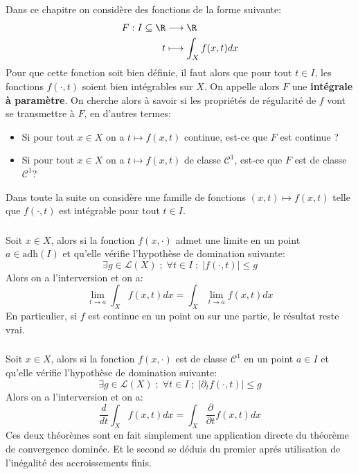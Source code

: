 \chapter*{} %
Dans ce chapitre on considère des fonctions de la forme suivante:
\[
   \begin{aligned}
      F : I \subseteq \R &\longrightarrow \R\\
      t &\longmapsto \int_X f(x, t) dx
   \end{aligned}
\]
Pour que cette fonction soit bien définie, il faut alors que pour tout \(t \in I\), les fonctions \(f(\cdot, t)\) soient bien intégrables sur \(X\). On appelle alors \(F\) une \textbf{intégrale à paramètre}. On cherche alors à savoir si les propriétés de régularité de \(f\) vont se transmettre à \(F\), en d'autres termes:
\begin{itemize}
   \item Si pour tout \(x \in X\) on a \(t \mapsto f(x, t)\) continue, est-ce que \(F\) est continue ?
   \item Si pour tout \(x \in X\) on a \(t \mapsto f(x, t)\) de classe \(\mathcal{C}^1\), est-ce que \(F\) est de classe \(\mathcal{C}^1\)?
\end{itemize}
Dans toute la suite on considère une famille de fonctions \((x, t) \mapsto f(x, t)\) telle que \(f(\cdot, t)\) est intégrable pour tout \(t \in I\).

\subsection*{}
Soit \(x \in X\), alors si la fonction \(f(x, \cdot)\) admet une limite en un point \(a \in \text{adh}(I)\) et qu'elle vérifie l'hypothèse de domination suivante:
\[
   \exists g \in \mathcal{L}(X) \; ; \; \forall t \in I \; ; \; |f(\cdot, t)| \leq g
\]
Alors on a l'interversion et on a:
\[
   \lim_{t \rightarrow a} \int_X f(x, t) dx = \int_X \lim_{t \rightarrow a} f(x, t) dx
\]
En particulier, si \(f\) est continue en un point ou sur une partie, le résultat reste vrai.

\subsection*{}
Soit \(x \in X\), alors si la fonction \(f(x, \cdot)\) est de classe \(\mathcal{C}^1\) en un point \(a \in I\) et qu'elle vérifie l'hypothèse de domination suivante:
\[
   \exists g \in \mathcal{L}(X) \; ; \; \forall t \in I \; ; \; |\partial_tf(\cdot, t)| \leq g
\]
Alors on a l'interversion et on a:
\[
   \frac{d}{dt}\int_X f(x, t) dx = \int_X \frac{\partial}{\partial t} f(x, t) dx
\]
Ces deux théorèmes sont en fait simplement une application directe du théorème de convergence dominée. Et le second se déduis du premier aprés utilisation de l'inégalité des accroissements finis.

